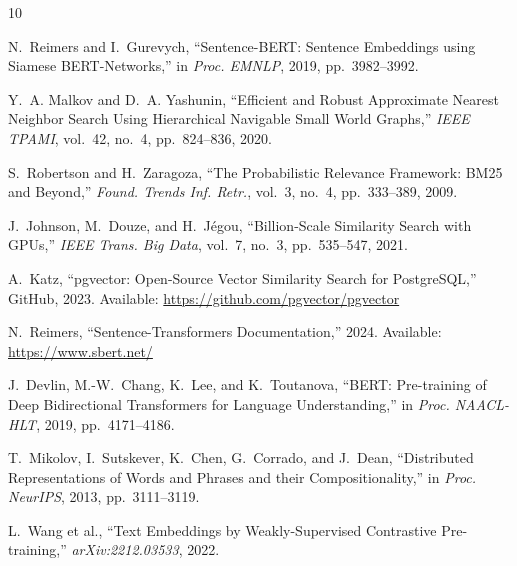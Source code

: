 \documentclass[12pt,a4paper]{article}
\begin{document}
\newpage
\begin{thebibliography}{10}

N.~Reimers and I.~Gurevych,
``Sentence-BERT: Sentence Embeddings using Siamese BERT-Networks,''
in \textit{Proc. EMNLP}, 2019, pp.~3982--3992.

Y.~A. Malkov and D.~A. Yashunin,
``Efficient and Robust Approximate Nearest Neighbor Search Using Hierarchical Navigable Small World Graphs,''
\textit{IEEE TPAMI}, vol.~42, no.~4, pp.~824--836, 2020.

S.~Robertson and H.~Zaragoza,
``The Probabilistic Relevance Framework: BM25 and Beyond,''
\textit{Found. Trends Inf. Retr.}, vol.~3, no.~4, pp.~333--389, 2009.

J.~Johnson, M.~Douze, and H.~J\'{e}gou,
``Billion-Scale Similarity Search with GPUs,''
\textit{IEEE Trans. Big Data}, vol.~7, no.~3, pp.~535--547, 2021.

A.~Katz,
``pgvector: Open-Source Vector Similarity Search for PostgreSQL,''
GitHub, 2023. Available: \url{https://github.com/pgvector/pgvector}

N.~Reimers,
``Sentence-Transformers Documentation,''
2024. Available: \url{https://www.sbert.net/}

J.~Devlin, M.-W.~Chang, K.~Lee, and K.~Toutanova,
``BERT: Pre-training of Deep Bidirectional Transformers for Language Understanding,''
in \textit{Proc. NAACL-HLT}, 2019, pp.~4171--4186.

T.~Mikolov, I.~Sutskever, K.~Chen, G.~Corrado, and J.~Dean,
``Distributed Representations of Words and Phrases and their Compositionality,''
in \textit{Proc. NeurIPS}, 2013, pp.~3111--3119.

L.~Wang et al.,
``Text Embeddings by Weakly-Supervised Contrastive Pre-training,''
\textit{arXiv:2212.03533}, 2022.

\end{thebibliography}
\end{document}

